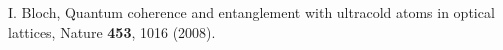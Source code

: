  I. Bloch, Quantum coherence and entanglement with
  ultracold atoms in optical lattices, Nature {\bf 453}, 1016 (2008).

